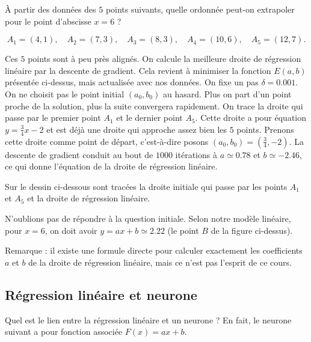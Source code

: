 \documentclass[10pt,class=report,crop=false]{standalone}
\begin{document}
\begin{exemple}
\`A partir des données des $5$ points suivants, quelle ordonnée peut-on extrapoler pour le point d'abscisse $x=6$ ?

$$A_1 = (4,1),\quad A_2 = (7,3),\quad A_3 = (8,3),\quad A_4 = (10,6),\quad A_5 = (12,7).$$

Ces $5$ points sont à peu près alignés. On calcule la meilleure droite de régression linéaire par la descente de gradient. Cela revient à minimiser la fonction $E(a,b)$ présentée ci-dessus, mais actualisée avec nos données. 
On fixe un pas $\delta = 0.001$.
On ne choisit pas le point initial $(a_0,b_0)$ au hasard. Plus on part d'un point proche de la solution, plus la suite convergera rapidement. On trace la droite qui passe par le premier point $A_1$ et le dernier point $A_5$. Cette droite a pour équation $y=\frac34 x -2$ et est déjà une droite qui approche assez bien les $5$ points. Prenons cette droite comme point de départ, c'est-à-dire posons $(a_0,b_0) = (\frac34,-2)$.
La descente de gradient conduit au bout de $1000$ itérations à $a\simeq 0.78$ et $b\simeq -2.46$,
ce qui donne l'équation de la droite de régression linéaire.

Sur le dessin ci-dessous sont tracées la droite initiale qui passe par les points $A_1$ et $A_5$ et la droite de régression linéaire.


N'oublions pas de répondre à la question initiale. Selon notre modèle linéaire, pour $x=6$, on doit avoir $y=ax+b \simeq 2.22$ (le point $B$ de la figure ci-dessus).
\end{exemple}

Remarque : il existe une formule directe pour calculer exactement les coefficients $a$ et $b$ de la droite de régression linéaire, mais ce n'est pas l'esprit de ce cours.


\subsection{Régression linéaire et neurone}

Quel est le lien entre la régression linéaire et un neurone ?
En fait, le neurone suivant a pour fonction associée $F(x) = ax+b$.

\end{document}
